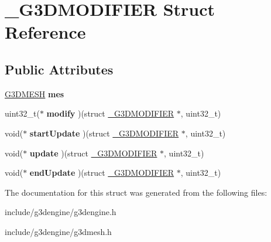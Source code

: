 \hypertarget{struct__G3DMODIFIER}{}\section{\+\_\+\+G3\+D\+M\+O\+D\+I\+F\+I\+ER Struct Reference}
\label{struct__G3DMODIFIER}
\subsection*{Public Attributes}
\begin{DoxyCompactItemize}
\item 
\mbox{\label{struct__G3DMODIFIER_a0b7ce6839ad801f3c465ae2005f0438f}} 
\hyperlink{struct__G3DMESH}{G3\+D\+M\+E\+SH} {\bfseries mes}
\item 
\mbox{\label{struct__G3DMODIFIER_af2d04ab53e1629ff6e76b30fa74e87d4}} 
uint32\+\_\+t($\ast$ {\bfseries modify} )(struct \hyperlink{struct__G3DMODIFIER}{\+\_\+\+G3\+D\+M\+O\+D\+I\+F\+I\+ER} $\ast$, uint32\+\_\+t)
\item 
\mbox{\label{struct__G3DMODIFIER_a00838b0ee0c46dafeeeb9cf2f22adf29}} 
void($\ast$ {\bfseries start\+Update} )(struct \hyperlink{struct__G3DMODIFIER}{\+\_\+\+G3\+D\+M\+O\+D\+I\+F\+I\+ER} $\ast$, uint32\+\_\+t)
\item 
\mbox{\label{struct__G3DMODIFIER_a80f1d5a5d2e25d0aaec6b784b96acd02}} 
void($\ast$ {\bfseries update} )(struct \hyperlink{struct__G3DMODIFIER}{\+\_\+\+G3\+D\+M\+O\+D\+I\+F\+I\+ER} $\ast$, uint32\+\_\+t)
\item 
\mbox{\label{struct__G3DMODIFIER_a26b3dc9d1f169b8c1233fdc0b8dcbf7f}} 
void($\ast$ {\bfseries end\+Update} )(struct \hyperlink{struct__G3DMODIFIER}{\+\_\+\+G3\+D\+M\+O\+D\+I\+F\+I\+ER} $\ast$, uint32\+\_\+t)
\end{DoxyCompactItemize}


The documentation for this struct was generated from the following files\+:\begin{DoxyCompactItemize}
\item 
include/g3dengine/g3dengine.\+h\item 
include/g3dengine/g3dmesh.\+h\end{DoxyCompactItemize}
